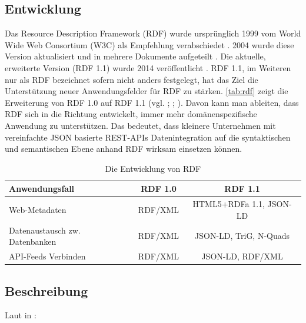 \documentclass[../main.tex]{subfiles}
\begin{document}
\subsection{Entwicklung}
\label{sec:entwicklung}

Das Resource Description Framework (RDF) wurde ursprünglich 1999 vom World Wide Web Consortium (W3C) als Empfehlung verabschiedet \autocite{Lassila:99:RMS}. 2004 wurde diese Version aktualisiert und in mehrere Dokumente aufgeteilt \autocite{Beckett:04:RSS}. Die aktuelle, erweiterte Version (RDF 1.1) wurde 2014 veröffentlicht \autocite{Schreiber:14:RP}. RDF 1.1, im Weiteren nur als RDF bezeichnet sofern nicht anders festgelegt, hat das Ziel die Unterstützung neuer Anwendungsfelder für RDF zu stärken. \autoref{tab:rdf} zeigt die Erweiterung von RDF 1.0 auf RDF 1.1 (vgl. \cite[Abs.~2]{Klyne:04:RDF}; \cite[Abs.~2]{Schreiber:14:RP}; \cite{Wood:14:WNR}). Davon kann man ableiten, dass RDF sich in die Richtung entwickelt, immer mehr domänenspezifische Anwendung zu unterstützen. Das bedeutet, dass kleinere Unternehmen mit vereinfachte JSON basierte REST-APIs Datenintegration\footnotemark{} auf die syntaktischen und semantischen Ebene anhand RDF wirksam einsetzen können.

\begin{table}[h]
	\centering
	\begin{tabular}{|p{9em}|c|c|}
		\hline \rule[-2ex]{0pt}{5.5ex} Anwendungsfall & RDF 1.0 & RDF 1.1 \\ 
		\hline \rule[-2ex]{0pt}{5.5ex} Web-Metadaten & RDF/XML & HTML5+RDFa 1.1, JSON-LD\\ 
		\hline \rule[-2ex]{0pt}{5.5ex} Datenaustausch zw. Datenbanken\footnotemark{}& RDF/XML & JSON-LD, TriG, N-Quads  \\
		\hline \rule[-2ex]{0pt}{5.5ex} API-Feeds Verbinden \footnotemark[\value{footnote}] & RDF/XML& JSON-LD, RDF/XML\\ 
		\hline
	\end{tabular}
	\caption{Die Entwicklung von RDF}
	\label{tab:rdf}
\end{table}

\subsection{Beschreibung} 

Laut \citeauthor{Schreiber:14:RP} in : 
\end{document}
